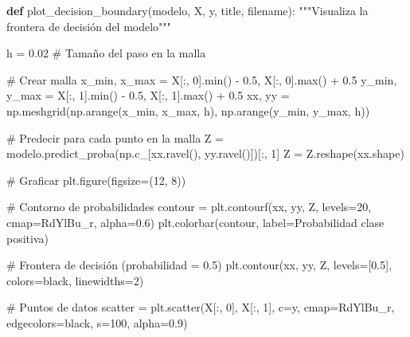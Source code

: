 \documentclass[
  doc,
  floatsintext,
  longtable,
  a4paper,
  nolmodern,
  notxfonts,
  notimes,
  12pt,
  colorlinks=true,linkcolor=blue,citecolor=blue,urlcolor=blue]{apa7}
\newenvironment{Shaded}{\begin{snugshade}}{\end{snugshade}}
\newcommand{\BuiltInTok}[1]{\textcolor[rgb]{0.00,0.23,0.31}{#1}}
\newcommand{\CommentTok}[1]{\textcolor[rgb]{0.37,0.37,0.37}{#1}}
\newcommand{\DecValTok}[1]{\textcolor[rgb]{0.68,0.00,0.00}{#1}}
\newcommand{\FloatTok}[1]{\textcolor[rgb]{0.68,0.00,0.00}{#1}}
\newcommand{\KeywordTok}[1]{\textcolor[rgb]{0.00,0.23,0.31}{\textbf{#1}}}
\newcommand{\NormalTok}[1]{\textcolor[rgb]{0.00,0.23,0.31}{#1}}
\newcommand{\OperatorTok}[1]{\textcolor[rgb]{0.37,0.37,0.37}{#1}}
\newcommand{\StringTok}[1]{\textcolor[rgb]{0.13,0.47,0.30}{#1}}
\begin{document}
\begin{Shaded}
\begin{Highlighting}[]
\KeywordTok{def}\NormalTok{ plot\_decision\_boundary(modelo, X, y, title, filename):}
    \CommentTok{"""Visualiza la frontera de decisión del modelo"""}
    
\NormalTok{    h }\OperatorTok{=} \FloatTok{0.02}  \CommentTok{\# Tamaño del paso en la malla}
    
    \CommentTok{\# Crear malla}
\NormalTok{    x\_min, x\_max }\OperatorTok{=}\NormalTok{ X[:, }\DecValTok{0}\NormalTok{].}\BuiltInTok{min}\NormalTok{() }\OperatorTok{{-}} \FloatTok{0.5}\NormalTok{, X[:, }\DecValTok{0}\NormalTok{].}\BuiltInTok{max}\NormalTok{() }\OperatorTok{+} \FloatTok{0.5}
\NormalTok{    y\_min, y\_max }\OperatorTok{=}\NormalTok{ X[:, }\DecValTok{1}\NormalTok{].}\BuiltInTok{min}\NormalTok{() }\OperatorTok{{-}} \FloatTok{0.5}\NormalTok{, X[:, }\DecValTok{1}\NormalTok{].}\BuiltInTok{max}\NormalTok{() }\OperatorTok{+} \FloatTok{0.5}
\NormalTok{    xx, yy }\OperatorTok{=}\NormalTok{ np.meshgrid(np.arange(x\_min, x\_max, h),}
\NormalTok{                         np.arange(y\_min, y\_max, h))}
    
    \CommentTok{\# Predecir para cada punto en la malla}
\NormalTok{    Z }\OperatorTok{=}\NormalTok{ modelo.predict\_proba(np.c\_[xx.ravel(), yy.ravel()])[:, }\DecValTok{1}\NormalTok{]}
\NormalTok{    Z }\OperatorTok{=}\NormalTok{ Z.reshape(xx.shape)}
    
    \CommentTok{\# Graficar}
\NormalTok{    plt.figure(figsize}\OperatorTok{=}\NormalTok{(}\DecValTok{12}\NormalTok{, }\DecValTok{8}\NormalTok{))}
    
    \CommentTok{\# Contorno de probabilidades}
\NormalTok{    contour }\OperatorTok{=}\NormalTok{ plt.contourf(xx, yy, Z, levels}\OperatorTok{=}\DecValTok{20}\NormalTok{, cmap}\OperatorTok{=}\StringTok{\textquotesingle{}RdYlBu\_r\textquotesingle{}}\NormalTok{, alpha}\OperatorTok{=}\FloatTok{0.6}\NormalTok{)}
\NormalTok{    plt.colorbar(contour, label}\OperatorTok{=}\StringTok{\textquotesingle{}Probabilidad clase positiva\textquotesingle{}}\NormalTok{)}
    
    \CommentTok{\# Frontera de decisión (probabilidad = 0.5)}
\NormalTok{    plt.contour(xx, yy, Z, levels}\OperatorTok{=}\NormalTok{[}\FloatTok{0.5}\NormalTok{], colors}\OperatorTok{=}\StringTok{\textquotesingle{}black\textquotesingle{}}\NormalTok{, linewidths}\OperatorTok{=}\DecValTok{2}\NormalTok{)}
    
    \CommentTok{\# Puntos de datos}
\NormalTok{    scatter }\OperatorTok{=}\NormalTok{ plt.scatter(X[:, }\DecValTok{0}\NormalTok{], X[:, }\DecValTok{1}\NormalTok{], c}\OperatorTok{=}\NormalTok{y, }
\NormalTok{                         cmap}\OperatorTok{=}\StringTok{\textquotesingle{}RdYlBu\_r\textquotesingle{}}\NormalTok{, edgecolors}\OperatorTok{=}\StringTok{\textquotesingle{}black\textquotesingle{}}\NormalTok{, }
\NormalTok{                         s}\OperatorTok{=}\DecValTok{100}\NormalTok{, alpha}\OperatorTok{=}\FloatTok{0.9}\NormalTok{)}
    

\end{Highlighting}
\end{Shaded}
\end{document}
